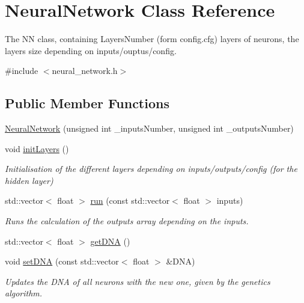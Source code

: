 \hypertarget{class_neural_network}{\section{Neural\-Network Class Reference}
\label{class_neural_network}
}


The N\-N class, containing Layers\-Number (form config.\-cfg) layers of neurons, the layers size depending on inputs/ouptus/config.  




{\ttfamily \#include $<$neural\-\_\-network.\-h$>$}

\subsection*{Public Member Functions}
\begin{DoxyCompactItemize}
\item 
\hyperlink{class_neural_network_a3af96ee26597b200166e3a2523d56ad9}{Neural\-Network} (unsigned int \-\_\-inputs\-Number, unsigned int \-\_\-outputs\-Number)
\item 
void \hyperlink{class_neural_network_ace5b58e0174ef1f318db06f0b19f694b}{init\-Layers} ()
\begin{DoxyCompactList}\small\item\em Initialisation of the different layers depending on inputs/outputs/config (for the hidden layer) \end{DoxyCompactList}\item 
std\-::vector$<$ float $>$ \hyperlink{class_neural_network_a2daf940807763cd3d81661f93d99e6ba}{run} (const std\-::vector$<$ float $>$ inputs)
\begin{DoxyCompactList}\small\item\em Runs the calculation of the outputs array depending on the inputs. \end{DoxyCompactList}\item 
std\-::vector$<$ float $>$ \hyperlink{class_neural_network_abd6e6ec0a4500527150c127f0f8d7c23}{get\-D\-N\-A} ()
\item 
void \hyperlink{class_neural_network_a38e8afa4eb8651b80c48b577ecdc6c4a}{set\-D\-N\-A} (const std\-::vector$<$ float $>$ \&D\-N\-A)
\begin{DoxyCompactList}\small\item\em Updates the D\-N\-A of all neurons with the new one, given by the genetics algorithm. \end{DoxyCompactList}\end{DoxyCompactItemize}



